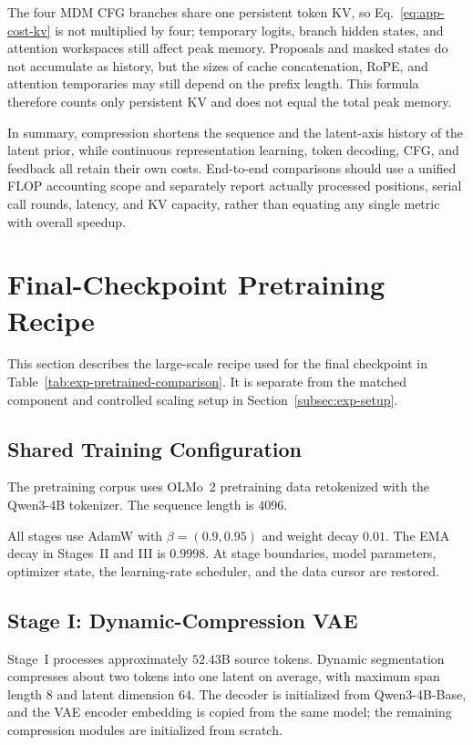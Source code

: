 The four MDM CFG branches share one persistent token KV, so Eq.~\eqref{eq:app-cost-kv} is not multiplied by four; temporary logits, branch hidden states, and attention workspaces still affect peak memory. Proposals and masked states do not accumulate as history, but the sizes of cache concatenation, RoPE, and attention temporaries may still depend on the prefix length. This formula therefore counts only persistent KV and does not equal the total peak memory.

In summary, compression shortens the sequence and the latent-axis history of the latent prior, while continuous representation learning, token decoding, CFG, and feedback all retain their own costs. End-to-end comparisons should use a unified FLOP accounting scope and separately report actually processed positions, serial call rounds, latency, and KV capacity, rather than equating any single metric with overall speedup.

\section{Final-Checkpoint Pretraining Recipe}
\label{app:final-pretraining}

This section describes the large-scale recipe used for the final checkpoint in Table~\ref{tab:exp-pretrained-comparison}. It is separate from the matched component and controlled scaling setup in Section~\ref{subsec:exp-setup}.

\subsection{Shared Training Configuration}

The pretraining corpus uses OLMo~2 pretraining data retokenized with the Qwen3-4B tokenizer. The sequence length is $4096$.

All stages use AdamW with $\beta=(0.9,0.95)$ and weight decay $0.01$. The EMA decay in Stages~II and III is $0.9998$. At stage boundaries, model parameters, optimizer state, the learning-rate scheduler, and the data cursor are restored.

\subsection{Stage I: Dynamic-Compression VAE}

Stage~I processes approximately $52.43$B source tokens. Dynamic segmentation compresses about two tokens into one latent on average, with maximum span length $8$ and latent dimension $64$. The decoder is initialized from Qwen3-4B-Base, and the VAE encoder embedding is copied from the same model; the remaining compression modules are initialized from scratch.

